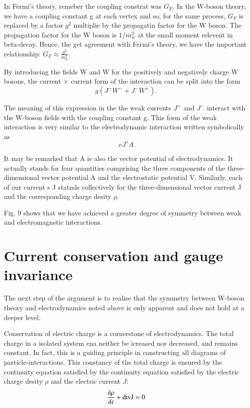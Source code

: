 In Fermi's theory, remeber the coupling constrat was $G_{F}$. In the W-boson theory, we have a coupling constant g at each vertex and so, for the same process, $G_{F}$ is replaced by a factor $g^{2}$ multiplie by the propagatin factor for the W boson. The propagation factor for the W boson is $1/m^{2}_{w}$ at the small moment relevent in beta-decay. Hence, the get agreement with Fermi's theory, we have the important relationship: $G_{F} \approx \frac{g^{2}}{m^{2}_{w}}$. 

By introducing the fields W and W for the positively and negatively charge W bosons, the current $\times$ current form of the interaction can be split into the form
$$
g(J^{+} W^{-} + J^{-} W^{+}).
$$

The meaning of this expression in the the weak currents $J^{+}$ and $J^{-}$ interact with the W-boson fields with the coupling constant g. This form of the weak interaction is very similar to the electrodynamic interaction written symbolically as 
$$
eJ^{\gamma} A
$$

It may be remarked that A is also the vector potential of electrodynamics. It actually stands for four quantities comprising the three components of the three-dimensional vector potential A and the electrostatic potential V. Similarly, each of our current s J statnds collectively for the three-dimensional vector current J and the corresponding charge desity $\rho$.

Fig. 9 shows that we have achieved a greater degree of symmetry between weak and electromagnetic interactions.

\section*{Current conservation and gauge invariance}

The next step of the argument is to realise that the symmetry between W-boson theory and electrodynamics noted above is only apparent and does not hold at a deeper level.

Conservation of electric charge is a cornerstone of electrodynamics. The total charge in a isolated system cna neither be icreased nor decreased, and remains constant. In fact, this is a guiding principle in constructing all diagrams of particle-interactions.  This constancy of the total charge is ensured by the continuity equation satisfied by the continuity equation satisfied by the electric charge desity $\rho$ and the electric current $J$:
$$
\frac{\delta \rho}{\delta t} + {\rm div}  {\rm J} = 0
$$

